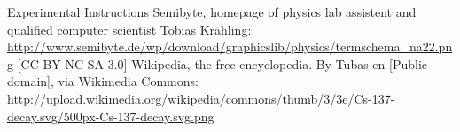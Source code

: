\documentclass[bigchapter,colorback,accentcolor=tud4b,linedtoc,11pt]{tudreport}
\begin{document}
\cleardoublepage{}
\newpage
\begin{thebibliography}{100}
   {Experimental Instructions}  {Semibyte, homepage of physics lab assistent and qualified
      computer scientist Tobias Krähling:
      \url{http://www.semibyte.de/wp/download/graphicslib/physics/termschema_na22.png}
    [CC BY-NC-SA 3.0]}
   {Wikipedia, the free encyclopedia. By Tubas-en [Public
      domain], via Wikimedia Commons: \url{http://upload.wikimedia.org/wikipedia/commons/thumb/3/3e/Cs-137-decay.svg/500px-Cs-137-decay.svg.png}}
\end{thebibliography}
\end{document}
